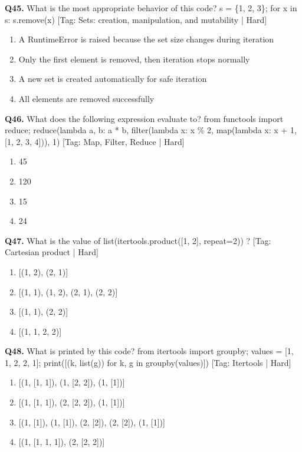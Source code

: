 \vspace{2mm}
\noindent\textbf{Q45.} What is the most appropriate behavior of this code? s = \{1, 2, 3\}; for x in s: s.remove(x) \hfill [Tag: Sets: creation, manipulation, and mutability | Hard]
\begin{enumerate}[label=(\alph*),topsep=2pt,itemsep=1pt,partopsep=0pt,parsep=0pt]
    \item {A RuntimeError is raised because the set size changes during iteration}
    \item {Only the first element is removed, then iteration stops normally}
    \item {A new set is created automatically for safe iteration}
    \item {All elements are removed successfully}
\end{enumerate}
\vspace{2mm}
\noindent\textbf{Q46.} What does the following expression evaluate to? from functools import reduce; reduce(lambda a, b: a * b, filter(lambda x: x \% 2, map(lambda x: x + 1, [1, 2, 3, 4])), 1) \hfill [Tag: Map, Filter, Reduce | Hard]
\begin{enumerate}[label=(\alph*),topsep=2pt,itemsep=1pt,partopsep=0pt,parsep=0pt]
    \item {45}
    \item {120}
    \item {15}
    \item {24}
\end{enumerate}
\vspace{2mm}
\noindent\textbf{Q47.} What is the value of list(itertools.product([1, 2], repeat=2)) ? \hfill [Tag: Cartesian product | Hard]
\begin{enumerate}[label=(\alph*),topsep=2pt,itemsep=1pt,partopsep=0pt,parsep=0pt]
    \item {[(1, 2), (2, 1)]}
    \item {[(1, 1), (1, 2), (2, 1), (2, 2)]}
    \item {[(1, 1), (2, 2)]}
    \item {[(1, 1, 2, 2)]}
\end{enumerate}
\vspace{2mm}
\noindent\textbf{Q48.} What is printed by this code? from itertools import groupby; values = [1, 1, 2, 2, 1]; print([(k, list(g)) for k, g in groupby(values)]) \hfill [Tag: Itertools | Hard]
\begin{enumerate}[label=(\alph*),topsep=2pt,itemsep=1pt,partopsep=0pt,parsep=0pt]
    \item {[(1, [1, 1]), (1, [2, 2]), (1, [1])]}
    \item {[(1, [1, 1]), (2, [2, 2]), (1, [1])]}
    \item {[(1, [1]), (1, [1]), (2, [2]), (2, [2]), (1, [1])]}
    \item {[(1, [1, 1, 1]), (2, [2, 2])]}
\end{enumerate}
